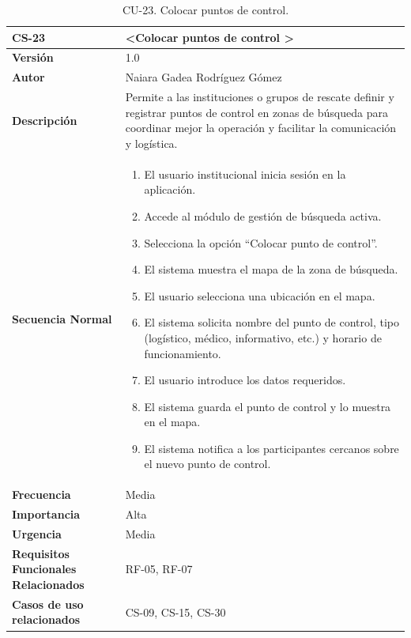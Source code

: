 \begin{table}[htbp] %
\centering
\begin{tabular}{ |m{3cm}|m{11cm}|  } 
\hline
\cellcolor[HTML]{B9E3F0}\centering\textbf{CS-23} & \cellcolor[HTML]{B9E3F0}\textbf{\textless Colocar puntos de control \textgreater}\\

\hline
\cellcolor[HTML]{EFEFEF}\textbf{Versión}             & 1.0  \\
\hline
\cellcolor[HTML]{EFEFEF}\textbf{Autor}                & Naiara Gadea Rodríguez Gómez\\
\hline
\cellcolor[HTML]{EFEFEF}\textbf{Descripción}                & {Permite a las instituciones o grupos de rescate definir y registrar puntos de control en zonas de búsqueda para coordinar mejor la operación y facilitar la comunicación y logística.}\\
\hline
\cellcolor[HTML]{EFEFEF}\textbf{Secuencia \newline Normal}                &                 
        \begin{enumerate}
			\item El usuario institucional inicia sesión en la aplicación.
			\item Accede al módulo de gestión de búsqueda activa.
			\item Selecciona la opción “Colocar punto de control”.
			\item El sistema muestra el mapa de la zona de búsqueda.
			\item El usuario selecciona una ubicación en el mapa.
			\item El sistema solicita nombre del punto de control, tipo (logístico, médico, informativo, etc.) y horario de funcionamiento.
			\item El usuario introduce los datos requeridos.
			\item El sistema guarda el punto de control y lo muestra en el mapa.
			\item El sistema notifica a los participantes cercanos sobre el nuevo punto de control.
		\end{enumerate}\\
\hline
\cellcolor[HTML]{EFEFEF}\textbf{Frecuencia}                & Media\\
\hline
\cellcolor[HTML]{EFEFEF}\textbf{Importancia}                & Alta\\
\hline
\cellcolor[HTML]{EFEFEF}\textbf{Urgencia}                & Media\\
\hline
\cellcolor[HTML]{EFEFEF}\textbf{Requisitos Funcionales Relacionados}                & {RF-05, RF-07}\\
\hline
\cellcolor[HTML]{EFEFEF}\textbf{Casos de uso relacionados}                & {CS-09, CS-15, CS-30}\\
\hline
\end{tabular}
\caption{CU-23. Colocar puntos de control.}
\end{table}

